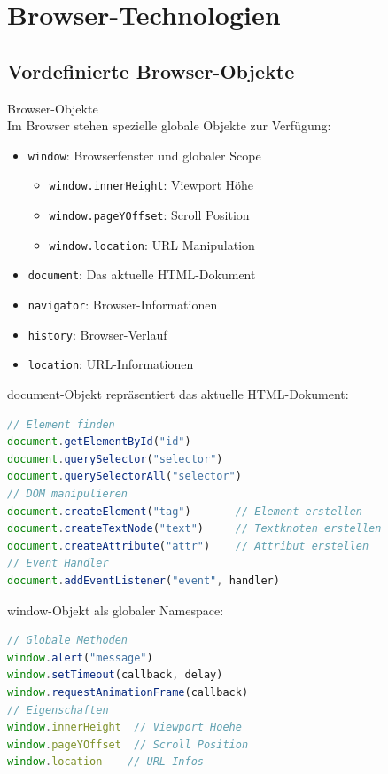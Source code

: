 \section{Browser-Technologien}

\subsection{Vordefinierte Browser-Objekte}

\begin{definition}{Browser-Objekte}\\
    Im Browser stehen spezielle globale Objekte zur Verfügung:
    \begin{itemize}
        \item \texttt{window}: Browserfenster und globaler Scope
            \begin{itemize}
                \item \texttt{window.innerHeight}: Viewport Höhe
                \item \texttt{window.pageYOffset}: Scroll Position
                \item \texttt{window.location}: URL Manipulation
            \end{itemize}
        \item \texttt{document}: Das aktuelle HTML-Dokument
        \item \texttt{navigator}: Browser-Informationen
        \item \texttt{history}: Browser-Verlauf
        \item \texttt{location}: URL-Informationen
    \end{itemize}
\end{definition}

\begin{KR}{document-Objekt} repräsentiert das aktuelle HTML-Dokument:
\begin{lstlisting}[language=JavaScript, style=basesmol]
// Element finden
document.getElementById("id")  
document.querySelector("selector") 
document.querySelectorAll("selector")
// DOM manipulieren
document.createElement("tag")       // Element erstellen  
document.createTextNode("text")     // Textknoten erstellen
document.createAttribute("attr")    // Attribut erstellen
// Event Handler
document.addEventListener("event", handler)
\end{lstlisting}
\end{KR}

\begin{KR}{window-Objekt} als globaler Namespace:
\begin{lstlisting}[language=JavaScript, style=basesmol]
// Globale Methoden
window.alert("message")
window.setTimeout(callback, delay)
window.requestAnimationFrame(callback)
// Eigenschaften
window.innerHeight  // Viewport Hoehe
window.pageYOffset  // Scroll Position
window.location    // URL Infos
\end{lstlisting}
\end{KR}

